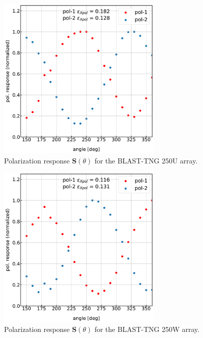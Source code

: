 \begin{figure}[!htbp]
\centering
\includegraphics[width=0.7\textwidth]{figures/blast_data/polarization/250U_poleff}
\caption{Polarization response $\mathbf{S}(\theta)$ for the BLAST-TNG 250U array.}
\label{fig:250U pol}
\end{figure}

\begin{figure}[!htbp]
\centering
\includegraphics[width=0.7\textwidth]{figures/blast_data/polarization/250W_poleff}
\caption{Polarization response $\mathbf{S}(\theta)$ for the BLAST-TNG 250W array.}
\label{fig:250W pol}
\end{figure}

